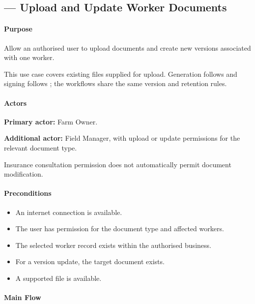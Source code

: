 \subsection{ --- Upload and Update Worker Documents}
\label{uc:13}

\paragraph{Purpose}

Allow an authorised user to upload documents
and create new versions associated with
one worker.

This use case covers existing files supplied for upload. Generation follows
 and signing follows ; the workflows share the
same version and retention rules.


\paragraph{Actors}

\textbf{Primary actor:} Farm Owner.

\textbf{Additional actor:} Field Manager,
with upload or update
permissions for the relevant document type.

Insurance consultation permission does not
automatically permit document modification.

\paragraph{Preconditions}

\begin{itemize}
    \item An internet connection is available.
    \item The user has permission
    for the document type and affected workers.
    \item The selected worker record exists within the authorised business.
    \item For a version update,
    the target document exists.
    \item A supported file is available.
\end{itemize}

\paragraph{Main Flow}


